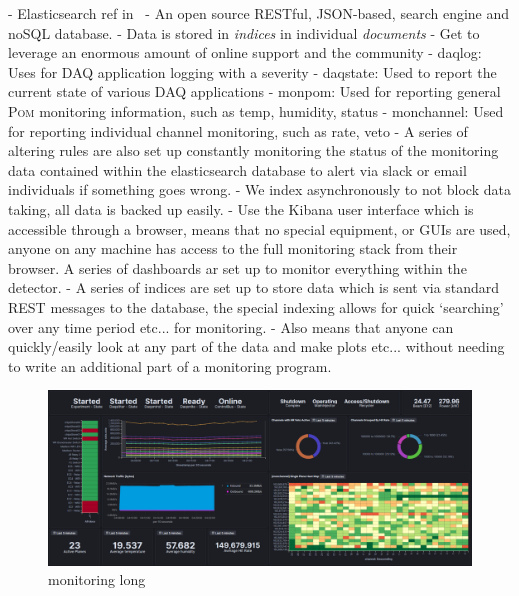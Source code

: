 - Elasticsearch ref in~\cite{elastic2020}
- An open source RESTful, JSON-based, search engine and noSQL database.
- Data is stored in \emph{indices} in individual \emph{documents}
- Get to leverage an enormous amount of online support and the community
- daqlog: Uses for DAQ application logging with a severity
- daqstate: Used to report the current state of various DAQ applications
- monpom: Used for reporting general \textsc{Pom} monitoring information, such as temp, humidity, status
- monchannel: Used for reporting individual channel monitoring, such as rate, veto
- A series of altering rules are also set up constantly monitoring the status of the monitoring
data contained within the elasticsearch database to alert via slack or email individuals if something goes wrong.
- We index asynchronously to not block data taking, all data is backed up easily.
- Use the Kibana user interface which is accessible through a browser, means that no special
equipment, or GUIs are used, anyone on any machine has access to the full monitoring stack from
their browser. A series of dashboards ar set up to monitor everything within the detector.
- A series of indices are set up to store data which is sent via standard REST messages to the
database, the special indexing allows for quick `searching' over any time period etc... for
monitoring.
- Also means that anyone can quickly/easily look at any part of the data and make plots etc...
without needing to write an additional part of a monitoring program.

\begin{figure} %
    \includegraphics[width=\textwidth]{diagrams/5-daq/monitoring.pdf}
    \caption[monitoring short]
    {monitoring long}
    \label{fig:monitoring}
\end{figure}